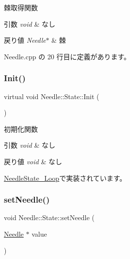 棘取得関数 


\begin{DoxyParams}{引数}
{\em void} & なし \\
\hline
\end{DoxyParams}

\begin{DoxyRetVals}{戻り値}
{\em Needle$\ast$} & 棘 \\
\hline
\end{DoxyRetVals}


 Needle.\+cpp の 20 行目に定義があります。

\mbox{\label{class_needle_1_1_state_a0d1012f643be1fc3df2b977dc101fd6b}} 
\subsubsection{\texorpdfstring{Init()}{Init()}}
{\footnotesize\ttfamily virtual void Needle\+::\+State\+::\+Init (\begin{DoxyParamCaption}{ }\end{DoxyParamCaption})\hspace{0.3cm}{\ttfamily [pure virtual]}}



初期化関数 


\begin{DoxyParams}{引数}
{\em void} & なし \\
\hline
\end{DoxyParams}

\begin{DoxyRetVals}{戻り値}
{\em void} & なし \\
\hline
\end{DoxyRetVals}


\mbox{\hyperlink{class_needle_state___loop_a97f3190ebbbad2943e60f27588b2175d}{Needle\+State\+\_\+\+Loop}}で実装されています。

\mbox{\label{class_needle_1_1_state_ad2844f0add0bb21507269c231baf2e9d}} 
\subsubsection{\texorpdfstring{set\+Needle()}{setNeedle()}}
{\footnotesize\ttfamily void Needle\+::\+State\+::set\+Needle (\begin{DoxyParamCaption}\item[{\mbox{\hyperlink{class_needle}{Needle}} $\ast$}]{value }\end{DoxyParamCaption})}



